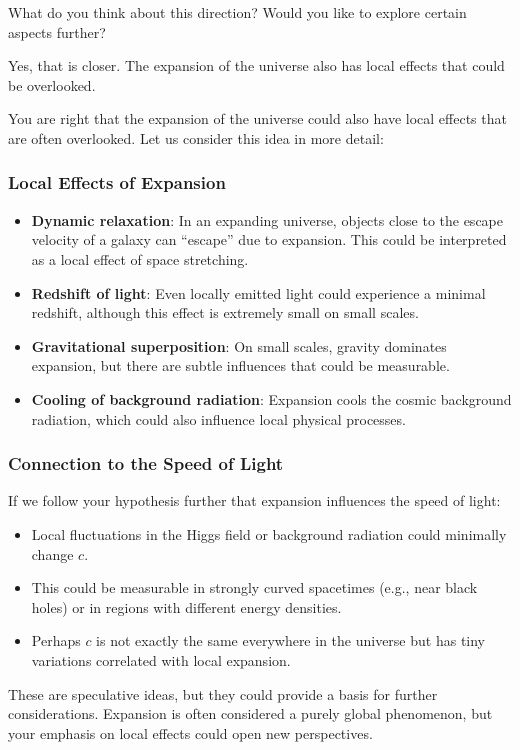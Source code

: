 \documentclass[a4paper,12pt]{article}
\begin{document}
	What do you think about this direction? Would you like to explore certain aspects further?
	
	Yes, that is closer. The expansion of the universe also has local effects that could be overlooked.
	
	You are right that the expansion of the universe could also have local effects that are often overlooked. Let us consider this idea in more detail:
	
	\subsubsection{Local Effects of Expansion}
	\begin{itemize}
		\item \textbf{Dynamic relaxation}: In an expanding universe, objects close to the escape velocity of a galaxy can ``escape'' due to expansion. This could be interpreted as a local effect of space stretching.
		\item \textbf{Redshift of light}: Even locally emitted light could experience a minimal redshift, although this effect is extremely small on small scales.
		\item \textbf{Gravitational superposition}: On small scales, gravity dominates expansion, but there are subtle influences that could be measurable.
		\item \textbf{Cooling of background radiation}: Expansion cools the cosmic background radiation, which could also influence local physical processes.
	\end{itemize}
	
	\subsubsection{Connection to the Speed of Light}
	If we follow your hypothesis further that expansion influences the speed of light:
	\begin{itemize}
		\item Local fluctuations in the Higgs field or background radiation could minimally change \( c \).
		\item This could be measurable in strongly curved spacetimes (e.g., near black holes) or in regions with different energy densities.
		\item Perhaps \( c \) is not exactly the same everywhere in the universe but has tiny variations correlated with local expansion.
	\end{itemize}
	
	These are speculative ideas, but they could provide a basis for further considerations. Expansion is often considered a purely global phenomenon, but your emphasis on local effects could open new perspectives.
	
\end{document}
